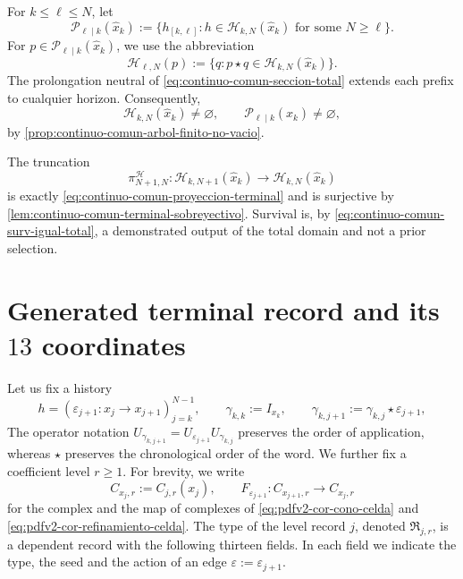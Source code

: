 For \(k\leq\ell\leq N\), let
\begin{equation}
\label{eq:pdfv2-terminal-prefijos-intermedios}
 \mathscr P_{\ell\mid k}(\widehat x_k)
 :=\{h_{[k,\ell]}:h\in\mathscr H_{k,N}(\widehat x_k)
       \text{ for some }N\geq\ell\}.
\end{equation}
For \(p\in\mathscr P_{\ell\mid k}(\widehat x_k)\), we use the abbreviation
\begin{equation}
\label{eq:pdfv2-terminal-continuaciones-prefijo}
 \mathscr H_{\ell,N}(p)
 :=\{q:p\star q\in\mathscr H_{k,N}(\widehat x_k)\}.
\end{equation}
The prolongation neutral of \eqref{eq:continuo-comun-seccion-total} extends
each prefix to cualquier horizon. Consequently,
\begin{equation}
\label{eq:pdfv2-terminal-no-vacuidad-historias}
 \mathscr H_{k,N}(\widehat x_k)\neq\varnothing,
 \qquad
 \mathscr P_{\ell\mid k}(\widehat x_k)\neq\varnothing,
\end{equation}
by \cref{prop:continuo-comun-arbol-finito-no-vacio}.

The truncation
\begin{equation}
\label{eq:pdfv2-terminal-truncamiento-historias}
 \pi_{N+1,N}^{\mathscr H}:
 \mathscr H_{k,N+1}(\widehat x_k)
 \longrightarrow\mathscr H_{k,N}(\widehat x_k)
\end{equation}
is exactly \eqref{eq:continuo-comun-proyeccion-terminal} and is
surjective by \cref{lem:continuo-comun-terminal-sobreyectivo}. Survival is, by
\eqref{eq:continuo-comun-surv-igual-total}, a demonstrated output of the total
domain and not a prior selection.

\section{Generated terminal record and its \(13\) coordinates}

Let us fix a history
\[
 h=(\varepsilon_{j+1}:x_j\longrightarrow x_{j+1})_{j=k}^{N-1},
 \qquad
 \gamma_{k,k}:=I_{x_k},\qquad
 \gamma_{k,j+1}:=\gamma_{k,j}\star\varepsilon_{j+1},
\]
The operator notation
\(U_{\gamma_{k,j+1}}
=U_{\varepsilon_{j+1}}U_{\gamma_{k,j}}\) preserves the order of application,
whereas \(\star\) preserves the chronological order of the word. We further fix
a coefficient level \(r\geq1\). For brevity, we write
\[
 C_{x_j,r}:=C_{j,r}(x_j),\qquad
 F_{\varepsilon_{j+1}}:C_{x_{j+1},r}\longrightarrow C_{x_j,r}
\]
for the complex and the map of complexes of
\eqref{eq:pdfv2-cor-cono-celda} and
\eqref{eq:pdfv2-cor-refinamiento-celda}. The type of the level record
\(j\), denoted \(\mathfrak R_{j,r}\), is a dependent record with the
following thirteen fields. In each field we indicate the type, the seed and the
action of an edge \(\varepsilon:=\varepsilon_{j+1}\).

